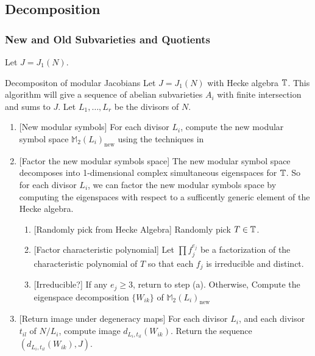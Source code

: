 \documentclass{article}
\begin{document}
\subsection{Decomposition}
\subsubsection{New and Old Subvarieties and Quotients}

Let $J=J_1(N)$.
\begin{algorithm}{Decompositon of modular Jacobians}
    \label{decomp_jacobian}
    Let $J=J_1(N)$ with Hecke algebra $\mathbb{T}$. This algorithm will give a sequence
    of abelian subvarieties $A_i$ with finite intersection and sums to $J$. Let
    $L_1,\ldots, L_r$ be the divisors of $N$.
    \begin{enumerate}
        \item{} [New modular symbols]
            For each divisor $L_i$, compute the new modular symbol space
            $\mathbb{M}_2(L_i)_\mathrm{new}$ using the techniques in \cite[\S
            8]{stein:modform}
        \item{} [Factor the new modular symbols space]
            The new modular symbol space decomposes into 1-dimensional complex
            simultaneous eigenspaces for $\mathbb{T}$. So for each divisor $L_i$, we can
            factor the new modular symbols space by computing the eigenspaces
            with respect to a sufficently generic element of the Hecke algebra.
            \begin{enumerate}
                \item{} [Randomly pick from Hecke Algebra]
                    Randomly pick $T\in \mathbb{T}$.
                \item{} [Factor characteristic polynomial]
                    Let $\prod f_j ^{e_j}$ be a factorization of the characteristic
                    polynomial of $T$ so that each $f_j$ is irreducible and
                    distinct.
                \item{} [Irreducible?]
                    If any $e_j \geq 3$, return to step (a). Otherwise, Compute
                    the eigenspace decomposition $\{W_{ik}\}$ of
                    $\mathbb{M}_2(L_i)_\mathrm{new}$
            \end{enumerate}
        \item{} [Return image under degeneracy maps]
            For each divisor $L_i$, and each divisor $t_{il}$ of $N/L_i$,
            compute image $d_{L_i, t_{il}}(W_{ik})$. Return the sequence
            $(d_{L_i, t_{il}}(W_{ik}), J)$. 
    \end{enumerate}
\end{algorithm}
\end{document}
